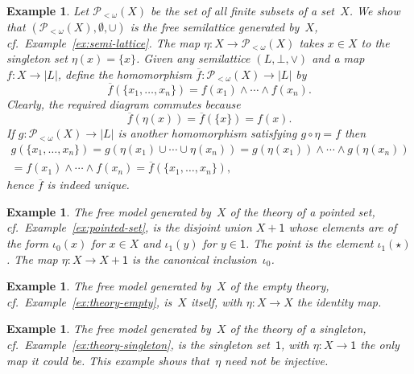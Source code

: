 \documentclass{amsart}
\newcommand{\set}[1]{\{#1\}} %
\newcommand{\finpow}[1]{\mathcal{P}_{{<}\omega}(#1)} %
\newcommand{\one}{\mathsf{1}} %
\newtheorem{example}[definition]{Example}
\begin{document}
\begin{example}
  Let $\finpow{X}$ be the set of all finite subsets of a set~$X$. We show that
  $(\finpow{X}, \emptyset, {\cup})$ is the free semilattice generated by~$X$, cf.\
  Example~\ref{ex:semi-lattice}. The map $\eta : X \to \finpow{X}$ takes $x \in X$ to the
  singleton set $\eta(x) = \set{x}$. Given any semilattice $(L, \bot, {\vee})$ and a map
  $f : X \to |L|$, define the homomorphism $\overline{f} : \finpow{X} \to |L|$ by
  \begin{equation*}
    \overline{f}(\set{x_1, \ldots, x_n}) = f(x_1) \wedge \cdots \wedge f(x_n).
  \end{equation*}
  Clearly, the required diagram commutes because
  \begin{equation*}
    \overline{f}(\eta(x)) = \overline{f}(\set{x}) = f(x).
  \end{equation*}
  If $g : \finpow{X} \to |L|$ is another homomorphism satisfying $g \circ \eta = f$ then
  \begin{multline*}
    g(\set{x_1, \ldots, x_n})
    = g(\eta(x_1) \cup \cdots \cup \eta(x_n))
    = g(\eta(x_1)) \wedge \cdots \wedge g(\eta(x_n)) \\
    = f(x_1) \wedge \cdots \wedge f(x_n)
    = \overline{f}(\set{x_1, \ldots, x_n}),
  \end{multline*}
  hence $\overline{f}$ is indeed unique.
\end{example}

\begin{example}
  The free model generated by~$X$ of the theory of a pointed set, cf.\
  Example~\ref{ex:pointed-set}, is the disjoint union $X + \one$ whose elements are of the
  form $\iota_0(x)$ for $x \in X$ and $\iota_1(y)$ for $y \in \one$. The point is the
  element $\iota_1(\star)$. The map $\eta : X \to X + \one$ is the canonical
  inclusion~$\iota_0$.
\end{example}

\begin{example}
  The free model generated by~$X$ of the empty theory, cf.\ Example~\ref{ex:theory-empty},
  is~$X$ itself, with $\eta : X \to X$ the identity map.
\end{example}

\begin{example}
  The free model generated by~$X$ of the theory of a singleton, cf.\
  Example~\ref{ex:theory-singleton}, is the singleton set~$\one$, with $\eta : X \to \one$
  the only map it could be. This example shows that~$\eta$ need not be injective.
\end{example}
\end{document}
